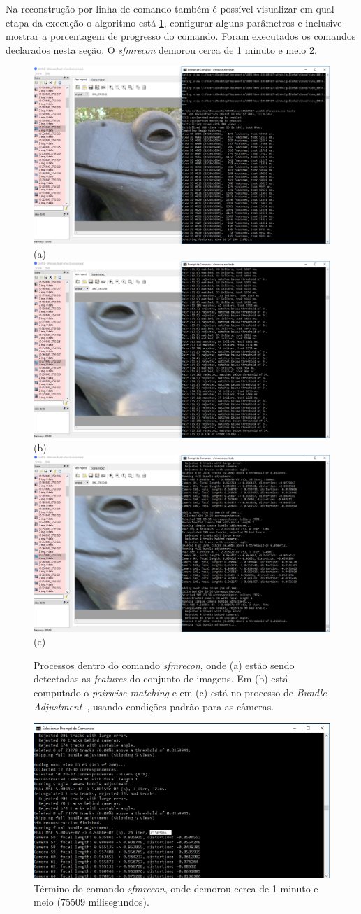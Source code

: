 Na reconstrução por linha de comando também é possível visualizar em qual etapa da execução o algoritmo está \ref{fig:passosMVE}, configurar alguns parâmetros e inclusive mostrar a porcentagem de progresso do comando. Foram executados os comandos declarados nesta seção.  O \emph{sfmrecon} demorou cerca de 1 minuto e meio \ref{fig:MVESfM}.

\begin{figure}[!h]
	\centering
	\includegraphics[width=0.5\linewidth]{figs/umve2sfm.png} (a)
	\includegraphics[width=0.5\linewidth]{figs/umve3sfmfeature.png} (b)
	\includegraphics[width=0.5\linewidth]{figs/umve4ba.png} (c)
	\caption{%
	Processos dentro do comando \emph{sfmrecon}, onde (a) estão sendo detectadas as \emph{features} do conjunto de imagens. Em (b) está computado o \emph{pairwise matching} e em (c) está no processo de \emph{Bundle Adjustment}~\cite{bundleAdjustmentSlide}, usando condições-padrão para as câmeras.
	}\label{fig:passosMVE}
\end{figure} 

\begin{figure}[!h]
	\centering
	\includegraphics[width=0.8\linewidth]{figs/sfmmve.png}
	\caption{%
	Término do comando \emph{sfmrecon}, onde demorou cerca de 1 minuto e meio (75509 milisegundos).
	}\label{fig:MVESfM}
\end{figure}

